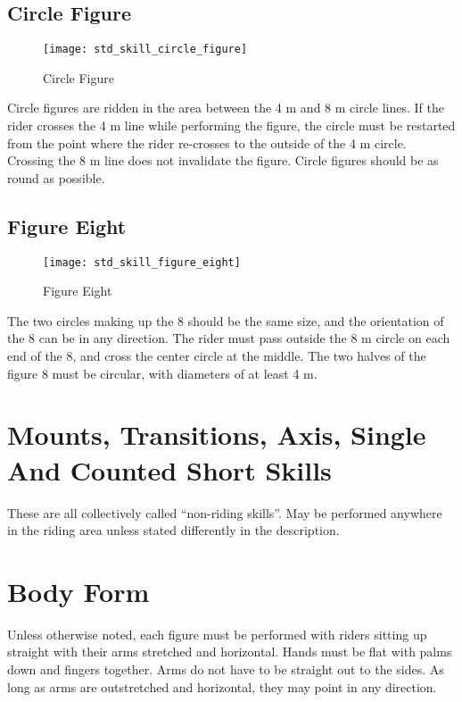 \subsection{Circle Figure}
\begin{wrapfigure}{r}{0.35\textwidth}
\vspace{-75pt}
\begin{center}
\texttt{[image: std\_skill\_circle\_figure]}
\end{center}
\vspace{-20pt}
\caption{Circle Figure\label{fig:std_skill_circle_figure}}
\vspace{-10pt}
\end{wrapfigure}
Circle figures are ridden in the area between the 4 m and 8 m circle lines.
If the rider crosses the 4 m line while performing the figure, the circle must be restarted from the point where the rider re-crosses to the outside of the 4 m circle.
Crossing the 8 m line does not invalidate the figure.
Circle figures should be as round as possible.

\subsection{Figure Eight}
\begin{wrapfigure}{r}{0.35\textwidth}
\vspace{-45pt}
\begin{center}
\texttt{[image: std\_skill\_figure\_eight]}
\end{center}
\vspace{-20pt}
\caption{Figure Eight\label{fig:std_skill_figure_eight}}
\vspace{-10pt}
\end{wrapfigure}
The two circles making up the 8 should be the same size, and the orientation of the 8 can be in any direction.
The rider must pass outside the 8 m circle on each end of the 8, and cross the center circle at the middle.
The two halves of the figure 8 must be circular, with diameters of at least 4 m.

\section{Mounts, Transitions, Axis, Single And Counted Short Skills}
These are all collectively called ``non-riding skills''.
May be performed anywhere in the riding area unless stated differently in the description.

\section{Body Form}
Unless otherwise noted, each figure must be performed with riders sitting up straight with their arms stretched and horizontal.
Hands must be flat with palms down and fingers together.
Arms do not have to be straight out to the sides.
As long as arms are outstretched and horizontal, they may point in any direction.

